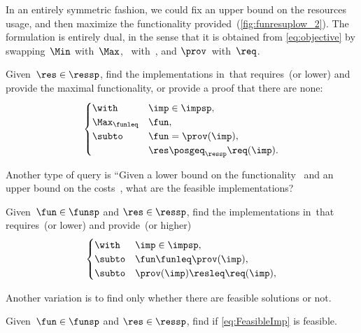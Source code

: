 In an entirely symmetric fashion, we could fix an upper bound on
the resources usage, and then maximize the functionality provided~(\cref{fig:funresuplow_2}).
The formulation is entirely dual, in the sense that it is obtained
from \cref{eq:objective} by swapping~$\Min$ with~$\Max$, \funsp~with~\ressp,
and $\prov$~with~$\req$.

\begin{problem}[\FixResMinFun]
    \label{prob:FixResMinFun}
    Given~$\res\in\ressp$, find the implementations
    in~\impsp that requires~\res (or lower)
    and provide the maximal functionality, or provide a proof that there are none:
    \begin{equation}
        \begin{cases}
            \with & \imp\in\impsp,\\
            \Max_{\funleq} & \fun,\\
            \subto & \fun=\prov(\imp),\\
            & \res\posgeq_{\ressp}\req(\imp).
        \end{cases}\label{eq:objective-1}
    \end{equation}
\end{problem}


\vspace{1cm}


Another type of query is
``Given a lower bound on the functionality~\fun
and an upper bound on the costs~\fun, what are the feasible implementations?


\begin{problem}[\FeasibleImp]
    \label{prob:FeasibleImp}
    Given~$\fun\in\funsp$ and $\res\in\ressp$, find the implementations
    in~\impsp that requires~\res (or lower)
    and provide~\fun (or higher)
    \begin{equation}
        \label{eq:FeasibleImp}
        \begin{cases}
            \with & \imp\in\impsp,\\
            \subto & \fun \funleq \prov(\imp),\\
            \subto &  \prov(\imp) \resleq \req(\imp) ,\\
        \end{cases}
    \end{equation}
\end{problem}

Another variation is to find only whether there are feasible solutions or not.

\begin{problem}[\Feasibility]
    \label{prob:Feasibility}
    Given~$\fun\in\funsp$ and $\res\in\ressp$, find if \cref{eq:FeasibleImp} is feasible.
\end{problem}

